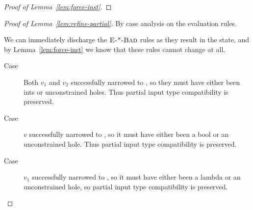 \begin{proof}[Proof of Lemma~\ref{lem:force-inst}]

\end{proof}


\begin{proof}[Proof of Lemma~\ref{lem:refine-partial}]
  By case analysis on the evaluation rules.

  We can immediately discharge the $\textsc{E-*-Bad}$ rules as they
  result in the \stuck state, and by Lemma~\ref{lem:force-inst} we know
  that these rules cannot change  at all.




  \begin{description}
  \item[Case \replusgood] Both $v_1$ and $v_2$ successfully narrowed to
    \tint, so they must have either been ints or unconstrained
    holes. Thus partial input type compatibility is preserved.

  \item[Case ] $v$ successfully narrowed to
    \tbool, so it must have either been a bool or an unconstrained hole.
    Thus partial input type compatibility is preserved.

  \item[Case \reappgood] $v_1$ successfully narrowed to \tfun, so it
    must have either been a lambda or an unconstrained hole, so partial
    input type compatibility is preserved.


\end{description}
\end{proof}
